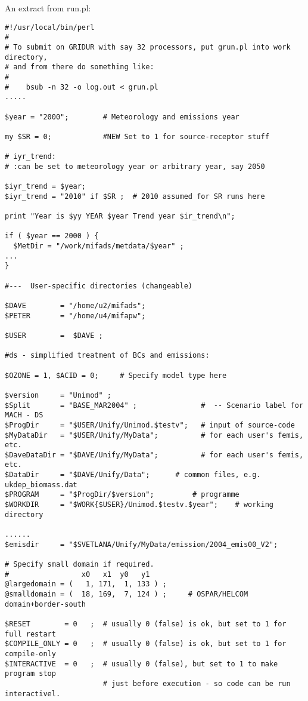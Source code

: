 An extract from run.pl:
\begin{verbatim}
#!/usr/local/bin/perl
#
# To submit on GRIDUR with say 32 processors, put grun.pl into work directory, 
# and from there do something like:
#
#    bsub -n 32 -o log.out < grun.pl
.....

$year = "2000";        # Meteorology and emissions year

my $SR = 0;            #NEW Set to 1 for source-receptor stuff

# iyr_trend:
# :can be set to meteorology year or arbitrary year, say 2050

$iyr_trend = $year;  
$iyr_trend = "2010" if $SR ;  # 2010 assumed for SR runs here

print "Year is $yy YEAR $year Trend year $ir_trend\n";

if ( $year == 2000 ) {
  $MetDir = "/work/mifads/metdata/$year" ;
...
}

#---  User-specific directories (changeable)

$DAVE        = "/home/u2/mifads";      
$PETER       = "/home/u4/mifapw";      

$USER        =  $DAVE ;      

#ds - simplified treatment of BCs and emissions:

$OZONE = 1, $ACID = 0;     # Specify model type here

$version     = "Unimod" ;  
$Split       = "BASE_MAR2004" ;               #  -- Scenario label for MACH - DS
$ProgDir     = "$USER/Unify/Unimod.$testv";   # input of source-code
$MyDataDir   = "$USER/Unify/MyData";          # for each user's femis, etc.
$DaveDataDir = "$DAVE/Unify/MyData";          # for each user's femis, etc.
$DataDir     = "$DAVE/Unify/Data";      # common files, e.g. ukdep_biomass.dat
$PROGRAM     = "$ProgDir/$version";         # programme
$WORKDIR     = "$WORK{$USER}/Unimod.$testv.$year";    # working directory

......
$emisdir     = "$SVETLANA/Unify/MyData/emission/2004_emis00_V2";

# Specify small domain if required. 
#                 x0   x1  y0   y1
@largedomain = (   1, 171,  1, 133 ) ;
@smalldomain = (  18, 169,  7, 124 ) ;     # OSPAR/HELCOM domain+border-south

$RESET        = 0   ;  # usually 0 (false) is ok, but set to 1 for full restart
$COMPILE_ONLY = 0   ;  # usually 0 (false) is ok, but set to 1 for compile-only
$INTERACTIVE  = 0   ;  # usually 0 (false), but set to 1 to make program stop
                       # just before execution - so code can be run interactivel.


\end{verbatim}
